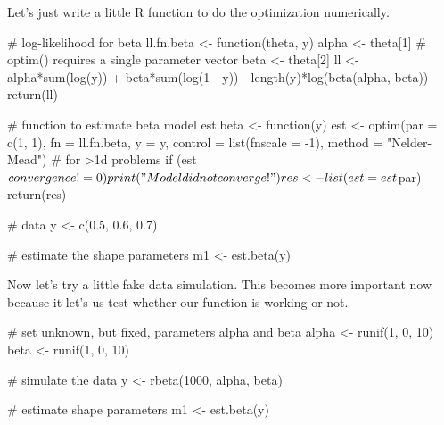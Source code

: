 \documentclass[handout]{beamer}
\begin{document}
\begin{frame}[fragile]
Let's just write a little R function to do the optimization numerically.
\begin{scriptsize}
\pause \begin{blockcode} 
# log-likelihood for beta
ll.fn.beta <- function(theta, y) {
  alpha <- theta[1]  # optim() requires a single parameter vector
  beta <- theta[2]
  ll <- alpha*sum(log(y)) + beta*sum(log(1 - y)) - 
           length(y)*log(beta(alpha, beta))
  return(ll)
}
\end{blockcode}

\pause \begin{blockcode}
# function to estimate beta model
est.beta <- function(y) {
  est <- optim(par = c(1, 1), fn = ll.fn.beta, y = y,
               control = list(fnscale = -1),
               method = "Nelder-Mead") # for >1d problems
  if (est$convergence != 0) print("Model did not converge!")
  res <- list(est = est$par)
  return(res)
}
\end{blockcode}

\pause \begin{blockcode}
# data
y <- c(0.5, 0.6, 0.7)

# estimate the shape parameters
m1 <- est.beta(y)
\end{blockcode}
\end{scriptsize}
\end{frame}

\begin{frame}[fragile]
Now let's try a little fake data simulation. This becomes more important now because it let's us test whether our function is working or not.
\pause \begin{blockcode}
# set unknown, but fixed, parameters alpha and beta
alpha <- runif(1, 0, 10)
beta <- runif(1, 0, 10)
\end{blockcode}

\pause \begin{blockcode}
# simulate the data
y <- rbeta(1000, alpha, beta)
\end{blockcode}

\pause \begin{blockcode}
# estimate shape parameters
m1 <- est.beta(y)
\end{blockcode}
\end{frame}

\end{document}
